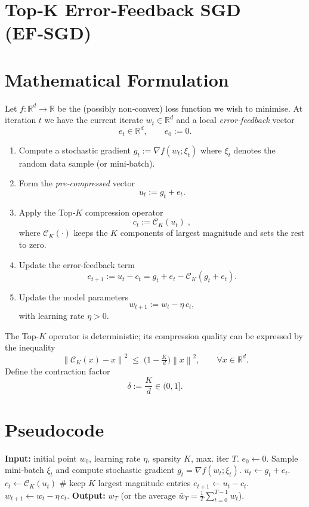 \documentclass{article}
\newcommand{\norm}[1]{\left\lVert #1\right\rVert}
\newcommand{\cK}{\mathcal{C}_K}
\begin{document}
\section*{Top‑K Error‑Feedback SGD (EF‑SGD)}

\section*{Mathematical Formulation}
Let $f:\mathbb{R}^d\rightarrow\mathbb{R}$ be the (possibly non‑convex) loss function we wish to minimise.
At iteration $t$ we have the current iterate $w_t\in\mathbb{R}^d$ and a local \emph{error‑feedback} vector
\[
e_t\in\mathbb{R}^d ,\qquad e_0:=0 .
\]

\begin{enumerate}[label=\textbf{Step \arabic*:}, leftmargin=*, nosep]
\item Compute a stochastic gradient $g_t:=\nabla f(w_t;\xi_t)$ where $\xi_t$ denotes the random data sample (or mini‑batch).
\item Form the \emph{pre‑compressed} vector 
\[
u_t:=g_t+e_t .
\]
\item Apply the Top‑$K$ compression operator 
\[
c_t:=\cK(u_t)\;,
\]
where $\cK(\cdot)$ keeps the $K$ components of largest magnitude and sets the rest to zero.
\item Update the error‑feedback term
\[
e_{t+1}:=u_t-c_t = g_t+e_t-\cK(g_t+e_t).
\]
\item Update the model parameters
\[
w_{t+1}:=w_t-\eta\,c_t,
\]
with learning rate $\eta>0$.
\end{enumerate}

The Top‑$K$ operator is deterministic; its compression quality can be expressed by the inequality
\begin{equation}
\label{eq:topk-contract}
\norm{\cK(x)-x}^2 \;\le\; \bigl(1-\tfrac{K}{d}\bigr)\norm{x}^2,\qquad\forall x\in\mathbb{R}^d .
\end{equation}
Define the contraction factor
\[
\delta:=\frac{K}{d}\in(0,1].
\]

\section*{Pseudocode}
\begin{algorithm}[H]
\caption{Top‑K EF‑SGD}
\begin{algorithmic}[1]
\STATE \textbf{Input:} initial point $w_0$, learning rate $\eta$, sparsity $K$, max. iter $T$.
\STATE $e_0\gets 0$.
    \STATE Sample mini‑batch $\xi_t$ and compute stochastic gradient $g_t=\nabla f(w_t;\xi_t)$.
    \STATE $u_t\gets g_t+e_t$.
    \STATE $c_t\gets \cK(u_t)$   \hfill\# keep $K$ largest magnitude entries
    \STATE $e_{t+1}\gets u_t-c_t$.
    \STATE $w_{t+1}\gets w_t-\eta\,c_t$.
\ENDFOR
\STATE \textbf{Output:} $w_T$ (or the average $\bar w_T=\frac1T\sum_{t=0}^{T-1}w_t$).
\end{algorithmic}
\end{algorithm}
\end{document}
